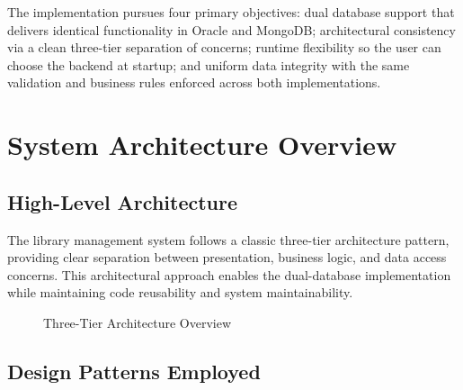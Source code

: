 \documentclass[12pt,a4paper]{article}
\begin{document}
The implementation pursues four primary objectives: dual database support that delivers identical functionality in Oracle and MongoDB; architectural consistency via a clean three-tier separation of concerns; runtime flexibility so the user can choose the backend at startup; and uniform data integrity with the same validation and business rules enforced across both implementations.

\section{System Architecture Overview}

\subsection{High-Level Architecture}

The library management system follows a classic three-tier architecture pattern, providing clear separation between presentation, business logic, and data access concerns. This architectural approach enables the dual-database implementation while maintaining code reusability and system maintainability.

\begin{figure}[H]
\centering
{}
\caption{Three-Tier Architecture Overview}
\end{figure}

\subsection{Design Patterns Employed}
\end{document}
